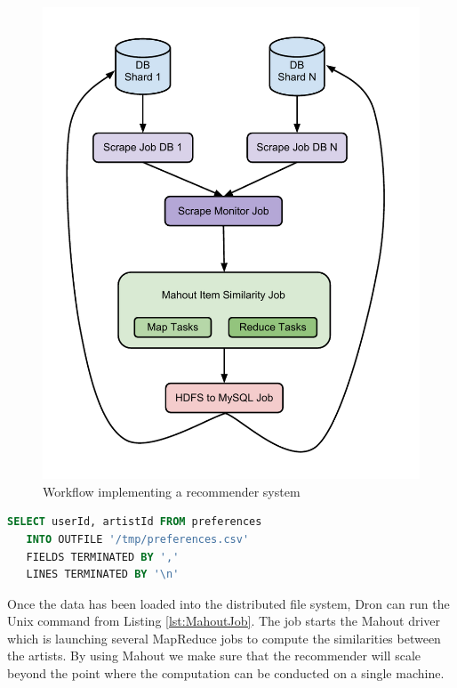 \documentclass[11pt,a4paper,twoside]{report}
\begin{document}
\begin{figure}[h]
\centering
\includegraphics[scale=0.75]{Recommender}
\caption{Workflow implementing a recommender system}
\label{fig:RecommendationEngine}
\end{figure}


\begin{lstlisting}[language=SQL, caption={SQL statement that dumps the preferences table to a file}, label={lst:DumpPreferences}]
 SELECT userId, artistId FROM preferences
   INTO OUTFILE '/tmp/preferences.csv'
   FIELDS TERMINATED BY ','
   LINES TERMINATED BY '\n'
\end{lstlisting}


Once the data has been loaded into the distributed file system, Dron can run the Unix command from Listing \ref{lst:MahoutJob}. The job starts the Mahout driver which is launching several MapReduce jobs to compute the similarities between the artists. By using Mahout we make sure that the recommender will scale beyond the point where the computation can be conducted on a single machine.
\newpage
\end{document}
